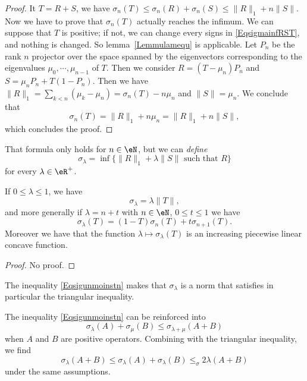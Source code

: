 \begin{proof}
It $T=R+S$, we have $\sigma_n(T)\leq\sigma_n(R)+\sigma_n(S)\leq \| R \|_1+n\| S \|$. Now we have to prove that $\sigma_n(T)$ actually reaches the infimum.  We can suppose that $T$ is positive; if not, we can change every signs in \eqref{EqsigmainfRST}, and nothing is changed. So lemma~\ref{Lemmulamequ} is applicable. Let $P_n$ be the rank $n$ projector over the space spanned by the eigenvectors corresponding to the eigenvalues $\mu_0,\cdots,\mu_{n-1}$ of $T$. Then we consider $R=(T-\mu_n)P_n$ and $S=\mu_nP_n+T(1-P_n)$. Then we have $\| R \|_1=\sum_{k<n}(\mu_k-\mu_n)=\sigma_n(T)-n\mu_n$ and $\| S \|=\mu_n$. We conclude that
\[
  \sigma_n(T)=\| R \|_1+n\mu_n=\| R \|_1+n\| S \|,
\]
which concludes the proof.
\end{proof}
That formula only holds for $n\in\eN$, but we can \emph{define}
\begin{equation}
\sigma_{\lambda}=\inf\{ \| R \|_1+\lambda\| S \|\text{ such that }R \}
\end{equation}
for every $\lambda\in\eR^{+}$.

\begin{proposition}
If $0\leq\lambda\leq 1$, we have
\[
  \sigma_{\lambda}=\lambda\| T \|,
\]
and more generally if $\lambda=n+t$ with $n\in\eN$, $0\leq t\leq 1$ we have
\begin{equation}	\label{Eqsigunmoinstn}
\sigma_{\lambda}(T)=(1-T)\sigma_n(T)+t\sigma_{n+1}(T).
\end{equation}
Moreover we have that the function $\lambda\mapsto\sigma_{\lambda}(T)$ is an increasing piecewise linear concave function.
\end{proposition}
\begin{proof}
No proof.
\end{proof}
The inequality \eqref{Eqsigunmoinstn} makes that $\sigma_{\lambda}$ is a norm that satisfies in particular the triangular inequality.

\begin{proposition}
The inequality \eqref{Eqsigunmoinstn} can be reinforced into
\begin{equation}
\sigma_{\lambda}(A)+\sigma_{\mu}(B)\leq \sigma_{\lambda+\mu}(A+B)
\end{equation}
when $A$ and $B$ are positive operators. Combining with the triangular inequality, we find
\begin{equation}
\sigma_{\lambda}(A+B)\leq\sigma_{\lambda}(A)+\sigma_{\lambda}(B)\leq_\sigma{2\lambda}(A+B)
\end{equation}
under the same assumptions.
\end{proposition}

